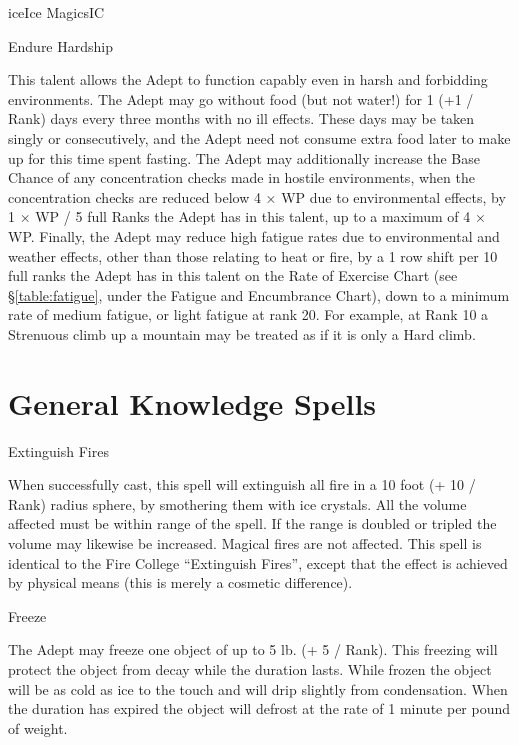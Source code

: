 \begin{College}[1.5]{ice}{Ice Magics}{IC}
\begin{talent}[T-2]{Endure Hardship}
\begin{effects}
This talent allows the Adept to function capably even in harsh and
forbidding environments.  The Adept may go without food (but not
water!) for 1 (+1 / Rank) days every three months with no ill
effects. These days may be taken singly or consecutively, and the
Adept need not consume extra food later to make up for this time spent
fasting.  The Adept may additionally increase the Base Chance of any
concentration checks made in hostile environments, when the
concentration checks are reduced below 4 × WP due to environmental
effects, by 1 × WP / 5 full Ranks the Adept has in this talent, up to
a maximum of 4 × WP.  Finally, the Adept may reduce high fatigue rates
due to environmental and weather effects, other than those relating to
heat or fire, by a 1 row shift per 10 full ranks the Adept has in this
talent on the Rate of Exercise Chart (see \S\ref{table:fatigue}, under
the Fatigue and Encumbrance Chart), down to a minimum rate of medium
fatigue, or light fatigue at rank 20.  For example, at Rank 10 a
Strenuous climb up a mountain may be treated as if it is only a Hard
climb.
\end{effects}
\end{talent}

\section{General Knowledge Spells}

\begin{spell}[G-1]{Extinguish Fires}

\begin{effects}
When successfully cast, this spell will extinguish all fire in a 10
foot (+ 10 / Rank) radius sphere, by smothering them with ice
crystals.  All the volume affected must be within range of the
spell. If the range is doubled or tripled the volume may likewise be
increased.  Magical fires are not affected.  This spell is identical
to the Fire College “Extinguish Fires”, except that the effect is
achieved by physical means (this is merely a cosmetic difference).
\end{effects}
\end{spell}

\begin{spell}[G-2]{Freeze}
\begin{effects}
The Adept may freeze one object of up to 5 lb.  (+ 5 / Rank).  This
freezing will protect the object from decay while the duration lasts.
While frozen the object will be as cold as ice to the touch and will
drip slightly from condensation. When the duration has expired the
object will defrost at the rate of 1 minute per pound of weight.
\end{effects}
\end{spell}


\end{College}

